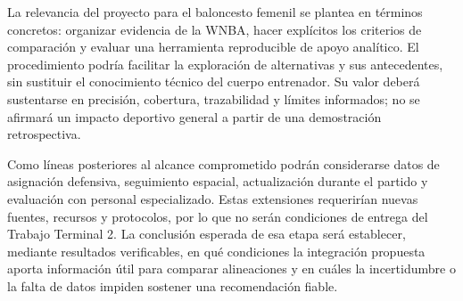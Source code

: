 La relevancia del proyecto para el baloncesto femenil se plantea en términos concretos: organizar evidencia de la WNBA, hacer explícitos los criterios de comparación y evaluar una herramienta reproducible de apoyo analítico. El procedimiento podría facilitar la exploración de alternativas y sus antecedentes, sin sustituir el conocimiento técnico del cuerpo entrenador. Su valor deberá sustentarse en precisión, cobertura, trazabilidad y límites informados; no se afirmará un impacto deportivo general a partir de una demostración retrospectiva.

Como líneas posteriores al alcance comprometido podrán considerarse datos de asignación defensiva, seguimiento espacial, actualización durante el partido y evaluación con personal especializado. Estas extensiones requerirían nuevas fuentes, recursos y protocolos, por lo que no serán condiciones de entrega del Trabajo Terminal 2. La conclusión esperada de esa etapa será establecer, mediante resultados verificables, en qué condiciones la integración propuesta aporta información útil para comparar alineaciones y en cuáles la incertidumbre o la falta de datos impiden sostener una recomendación fiable.
\endgroup
